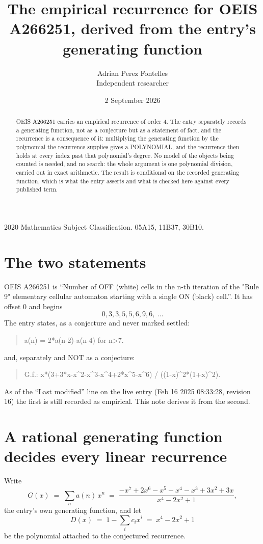 \documentclass[11pt,a4paper]{article}
\title{The empirical recurrence for OEIS A266251, derived from the entry's generating function}
\author{Adrian Perez Fontelles\\ \small Independent researcher}
\date{2 September 2026}
\theoremstyle{plain}
\theoremstyle{definition}
\begin{document}
\maketitle

\begin{abstract}
OEIS A266251 carries an empirical recurrence of order $4$. The entry separately records a
generating function, not as a conjecture but as a statement of fact, and the recurrence is a
consequence of it: multiplying the generating function by the polynomial the recurrence
supplies gives a POLYNOMIAL, and the recurrence then holds at every index past that
polynomial's degree. No model of the objects being counted is needed, and no search: the
whole argument is one polynomial division, carried out in exact arithmetic. The result is
conditional on the recorded generating function, which is what the entry asserts and what is
checked here against every published term.
\end{abstract}

\noindent\small 2020 Mathematics Subject Classification. 05A15, 11B37, 30B10.\normalsize

\section{The two statements}

OEIS A266251 is ``Number of OFF (white) cells in the n-th iteration of the "Rule 9" elementary cellular automaton starting with a single ON (black) cell.''. It has offset $0$ and begins
\[
0, 3, 3, 5, 5, 6, 9, 6,\ \dots
\]
The entry states, as a conjecture and never marked settled:
\begin{quote}
a(n) = 2*a(n-2)-a(n-4) for n>7.
\end{quote}
and, separately and NOT as a conjecture:
\begin{quote}
G.f.: x*(3+3*x-x\^{}2-x\^{}3-x\^{}4+2*x\^{}5-x\^{}6) / ((1-x)\^{}2*(1+x)\^{}2).
\end{quote}
As of the ``Last modified'' line on the live entry (Feb 16 2025 08:33:28, revision 16) the first is still
recorded as empirical. This note derives it from the second.

\section{A rational generating function decides every linear recurrence}

Write
\[
G(x)\;=\;\sum_{n}a(n)\,x^{n}\;=\;\frac{- x^{7} + 2 x^{6} - x^{5} - x^{4} - x^{3} + 3 x^{2} + 3 x}{x^{4} - 2 x^{2} + 1},
\]
the entry's own generating function, and let
\[
D(x)\;=\;1-\sum_i c_i x^{i}\;=\;x^{4} - 2 x^{2} + 1
\]
be the polynomial attached to the conjectured recurrence.
\end{document}
